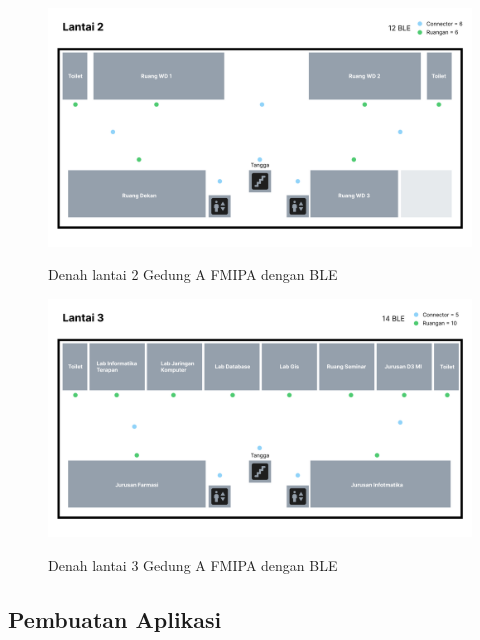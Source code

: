 \begin{enumerate}
\begin{figure}[H]
\centering
{\includegraphics [scale = 0.2]{gambar/bab4/Denah-2-BLE}}
\caption{Denah lantai 2 Gedung A FMIPA dengan BLE}
\label{img:denah_2_ble}
\end{figure}

\begin{figure}[H]
\centering
{\includegraphics [scale = 0.2]{gambar/bab4/Denah-3-BLE}}
\caption{Denah lantai 3 Gedung A FMIPA dengan BLE}
\label{img:denah_3_ble}
\end{figure}
    
	\end{enumerate}
	
	
	
\subsection{Pembuatan Aplikasi}


